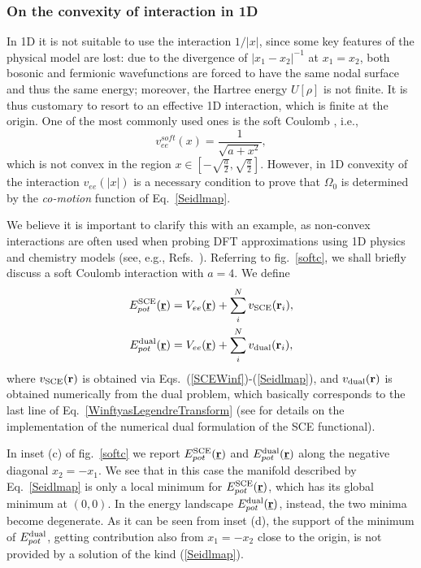 \documentclass[aps,pra,twocolumn,superscriptaddress]{revtex4}
\begin{document}
\subsubsection{On the convexity of interaction in 1D}\label{effectiveinteractionchoice}
In 1D it is not suitable to use the interaction $1/|x|$, since some key features of the physical model are lost: due to the divergence of $|x_1-x_2|^{-1}$ at $x_1=x_2$, both bosonic and fermionic wavefunctions are forced to have the same nodal surface and thus the same energy; moreover, the Hartree energy $U[\rho]$ is not finite. It is thus customary to resort to an effective 1D interaction, which is finite at the origin. One of the most commonly used ones is the soft Coulomb , i.e., 
\begin{equation}\label{softcoulomb}v_{ee}^{soft}(x)=\frac{1}{\sqrt{a+x^2}},
\end{equation}which is not convex in the region $x\in[-\sqrt{\frac{a}{2}},\sqrt{\frac{a}{2}}]$. However, in 1D convexity of the interaction $v_{ee}(|x|)$ is a necessary condition \cite{ColDepDiM-CJM-14} to prove that $\Omega_0$ is determined by the \textit{co-motion} function of Eq.~\eqref{Seidlmap}.

We believe it is important to clarify this with an example, as non-convex interactions are often used when probing DFT approximations using 1D physics and chemistry models (see, e.g., Refs.~\cite{WagStoBurWhi-PCCP-12,HelEtAl-PRA-11,MalMirGieWagGor-PCCP-14,CorKarLanLee-PRA-17}). Referring to fig.~\ref{softc}, we shall briefly discuss a soft Coulomb interaction with $a=4$. We define
\begin{equation}
\begin{aligned}
E_{pot}^{\text{\rm{SCE}}}(\underline{\textbf{r}})&=V_{ee}(\underline{\textbf{r}})+\sum_i^Nv_{\rm{\rm{SCE}}}(\textbf{r}_i),\\E_{pot}^{\rm dual}(\underline{\textbf{r}})&=V_{ee}(\underline{\textbf{r}})+\sum_i^N v_{\rm dual}(\textbf{r}_i),
\end{aligned}
\end{equation}
where $v_{\rm{\rm{SCE}}}(\textbf{r})$ is obtained via Eqs.~(\ref{SCEWinf})-(\ref{Seidlmap}), and $v_{\rm dual}(\textbf{r})$ is obtained numerically from the dual problem, which basically corresponds to the last line of Eq.~\eqref{WinftyasLegendreTransform} (see \citep{MenLin-PRB-13,VucWagMirGor-JCTC-15,SeiDiMGerNenGieGor-arxiv-17} for details on the implementation of the numerical dual formulation of the SCE functional). 

In inset (c) of fig.~\ref{softc} we report $E_{pot}^{\text{\rm{SCE}}}(\underline{\textbf{r}})$ and $E_{pot}^{\rm dual}(\underline{\textbf{r}})$ along the negative diagonal $x_2=-x_1$. We see that in this case the manifold described by Eq.~\eqref{Seidlmap} is only a local minimum for $E_{pot}^{\text{\rm{SCE}}}(\underline{\textbf{r}})$, which has its global minimum at $(0,0)$. In the energy landscape $E_{pot}^{\rm dual}(\underline{\textbf{r}})$, instead, the two minima become degenerate.  As it can be seen from inset (d), the support of the minimum of $E_{pot}^{\rm dual}$, getting contribution also from $x_1=-x_2$ close to the origin, is not provided by a solution of the kind (\ref{Seidlmap}).
\end{document}
